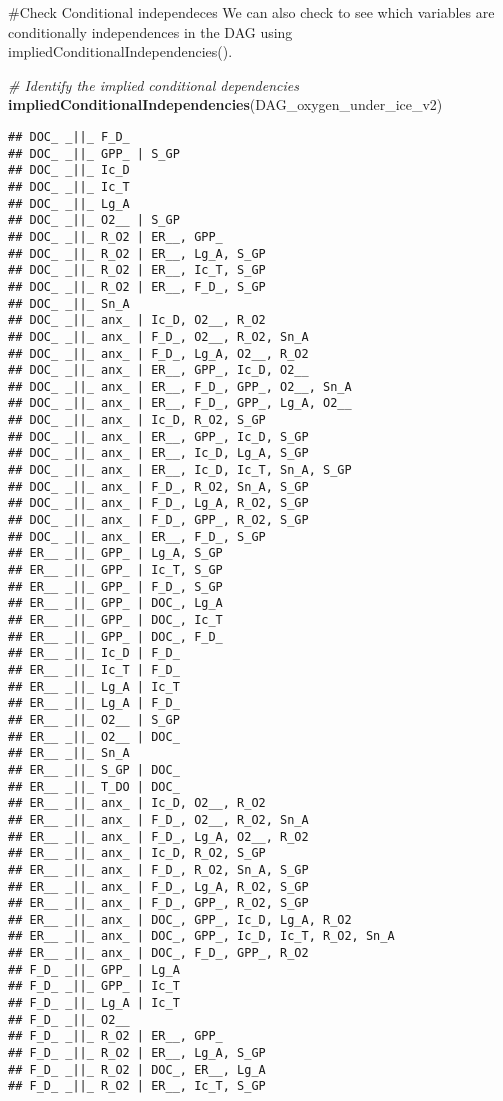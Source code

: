 \documentclass[]{article}
\newenvironment{Shaded}{\begin{snugshade}}{\end{snugshade}}
\newcommand{\CommentTok}[1]{\textcolor[rgb]{0.56,0.35,0.01}{\textit{#1}}}
\newcommand{\KeywordTok}[1]{\textcolor[rgb]{0.13,0.29,0.53}{\textbf{#1}}}
\newcommand{\NormalTok}[1]{#1}
\begin{document}
\#Check Conditional independeces We can also check to see which
variables are conditionally independences in the DAG using
impliedConditionalIndependencies().

\begin{Shaded}
\begin{Highlighting}[]
\CommentTok{# Identify the implied conditional dependencies}
\KeywordTok{impliedConditionalIndependencies}\NormalTok{(DAG_oxygen_under_ice_v2)}
\end{Highlighting}
\end{Shaded}

\begin{verbatim}
## DOC_ _||_ F_D_
## DOC_ _||_ GPP_ | S_GP
## DOC_ _||_ Ic_D
## DOC_ _||_ Ic_T
## DOC_ _||_ Lg_A
## DOC_ _||_ O2__ | S_GP
## DOC_ _||_ R_O2 | ER__, GPP_
## DOC_ _||_ R_O2 | ER__, Lg_A, S_GP
## DOC_ _||_ R_O2 | ER__, Ic_T, S_GP
## DOC_ _||_ R_O2 | ER__, F_D_, S_GP
## DOC_ _||_ Sn_A
## DOC_ _||_ anx_ | Ic_D, O2__, R_O2
## DOC_ _||_ anx_ | F_D_, O2__, R_O2, Sn_A
## DOC_ _||_ anx_ | F_D_, Lg_A, O2__, R_O2
## DOC_ _||_ anx_ | ER__, GPP_, Ic_D, O2__
## DOC_ _||_ anx_ | ER__, F_D_, GPP_, O2__, Sn_A
## DOC_ _||_ anx_ | ER__, F_D_, GPP_, Lg_A, O2__
## DOC_ _||_ anx_ | Ic_D, R_O2, S_GP
## DOC_ _||_ anx_ | ER__, GPP_, Ic_D, S_GP
## DOC_ _||_ anx_ | ER__, Ic_D, Lg_A, S_GP
## DOC_ _||_ anx_ | ER__, Ic_D, Ic_T, Sn_A, S_GP
## DOC_ _||_ anx_ | F_D_, R_O2, Sn_A, S_GP
## DOC_ _||_ anx_ | F_D_, Lg_A, R_O2, S_GP
## DOC_ _||_ anx_ | F_D_, GPP_, R_O2, S_GP
## DOC_ _||_ anx_ | ER__, F_D_, S_GP
## ER__ _||_ GPP_ | Lg_A, S_GP
## ER__ _||_ GPP_ | Ic_T, S_GP
## ER__ _||_ GPP_ | F_D_, S_GP
## ER__ _||_ GPP_ | DOC_, Lg_A
## ER__ _||_ GPP_ | DOC_, Ic_T
## ER__ _||_ GPP_ | DOC_, F_D_
## ER__ _||_ Ic_D | F_D_
## ER__ _||_ Ic_T | F_D_
## ER__ _||_ Lg_A | Ic_T
## ER__ _||_ Lg_A | F_D_
## ER__ _||_ O2__ | S_GP
## ER__ _||_ O2__ | DOC_
## ER__ _||_ Sn_A
## ER__ _||_ S_GP | DOC_
## ER__ _||_ T_DO | DOC_
## ER__ _||_ anx_ | Ic_D, O2__, R_O2
## ER__ _||_ anx_ | F_D_, O2__, R_O2, Sn_A
## ER__ _||_ anx_ | F_D_, Lg_A, O2__, R_O2
## ER__ _||_ anx_ | Ic_D, R_O2, S_GP
## ER__ _||_ anx_ | F_D_, R_O2, Sn_A, S_GP
## ER__ _||_ anx_ | F_D_, Lg_A, R_O2, S_GP
## ER__ _||_ anx_ | F_D_, GPP_, R_O2, S_GP
## ER__ _||_ anx_ | DOC_, GPP_, Ic_D, Lg_A, R_O2
## ER__ _||_ anx_ | DOC_, GPP_, Ic_D, Ic_T, R_O2, Sn_A
## ER__ _||_ anx_ | DOC_, F_D_, GPP_, R_O2
## F_D_ _||_ GPP_ | Lg_A
## F_D_ _||_ GPP_ | Ic_T
## F_D_ _||_ Lg_A | Ic_T
## F_D_ _||_ O2__
## F_D_ _||_ R_O2 | ER__, GPP_
## F_D_ _||_ R_O2 | ER__, Lg_A, S_GP
## F_D_ _||_ R_O2 | DOC_, ER__, Lg_A
## F_D_ _||_ R_O2 | ER__, Ic_T, S_GP

\end{verbatim}
\end{document}

